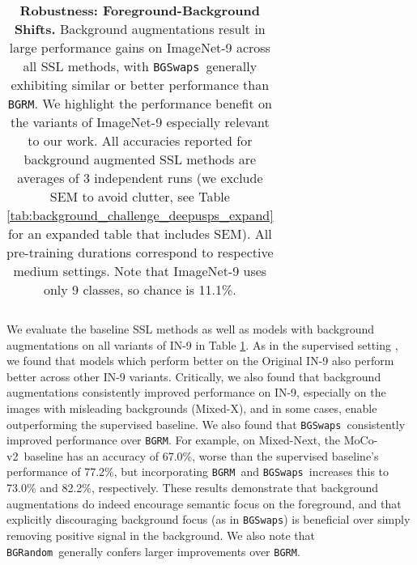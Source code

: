 \documentclass[twoside,11pt]{article}
\newcommand{\bgrm}{\texttt{BG\textunderscore RM}}
\newcommand{\bgswaps}{\texttt{BG\textunderscore Swaps}}
\newcommand{\bgrand}{\texttt{BG\textunderscore Random}}
\newcommand{\moco}{MoCo-v2}
\begin{document}
\begin{table}
{\begin{tabular}{lcccccccccc}
    \end{tabular}
    }
    \caption{\textbf{Robustness: Foreground-Background Shifts.} Background augmentations result in large performance gains on ImageNet-9 across all SSL methods, with \bgswaps~generally exhibiting similar or better performance than \bgrm. We highlight the performance benefit on the variants of ImageNet-9 especially relevant to our work. All accuracies reported for background augmented SSL methods are averages of 3 independent runs (we exclude SEM to avoid clutter, see Table \ref{tab:background_challenge_deepusps_expand} for an expanded table that includes SEM). All pre-training durations correspond to respective medium settings. Note that ImageNet-9 uses only 9 classes, so chance is 11.1\%.}
    \label{tab:background_challenge_deepusps}
\end{table}

We evaluate the baseline SSL methods as well as models with background augmentations on all variants of IN-9 in Table \ref{tab:background_challenge_deepusps}. As in the supervised setting  \citep[see][]{xiao2020noise}, we found that models which perform better on the Original IN-9 also perform better across other IN-9 variants. Critically, we also found that background augmentations consistently improved performance on IN-9, especially on the images with misleading backgrounds (Mixed-X), and in some cases, enable outperforming the supervised baseline. We also found that \bgswaps~consistently improved performance over \bgrm. For example, on Mixed-Next, the \moco~baseline has an accuracy of 67.0\%, worse than the supervised baseline's performance of 77.2\%, but incorporating \bgrm~and \bgswaps~increases this to 73.0\% and 82.2\%, respectively. These results demonstrate that background augmentations do indeed encourage semantic focus on the foreground, and that explicitly discouraging background focus (as in \bgswaps) is beneficial over simply removing positive signal in the background. We also note that \bgrand~generally confers larger improvements over \bgrm.
\end{document}
